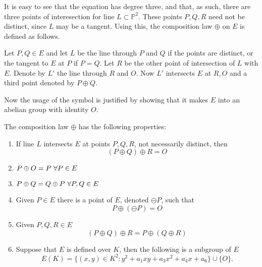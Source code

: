 It is easy to see that the equation has degree three, and that, as such, there are three points of interesection for line $L\subset\mathbb{P}^2$. These points $P,Q,R$ need not be distinct, since $L$ may be a tangent. Using this, the composition law $\oplus$ on $E$ is defined as follows.
\begin{defn}
	Let $P,Q\in E$ and let $L$ be the line through $P$ and $Q$ if the points are distinct, or the tangent to $E$ at $P$ if $P=Q$. Let $R$ be the other point of intersection of $L$ with $E$. Denote by $L'$ the line through $R$ and $O$. Now $L'$ intersects $E$ at $R,O$ and a third point denoted by $P\oplus Q$.
\end{defn}
Now the usage of the symbol is justified by showing that it makes $E$ into an abelian group with identity $O$.
\begin{thm}
	The composition law $\oplus$ has the following properties:
	\begin{enumerate}
		\item If line $L$ intersects $E$ at points $P,Q,R$, not necessarily distinct, then
		\begin{equation*}
		(P\oplus Q)\oplus R=O
		\end{equation*}
		\item $P\oplus O=P\text{\space}\forall P\in E$
		\item $P\oplus Q=Q\oplus P\text{\space}\forall P,Q\in E$
		\item Given $P\in E$ there is a point of $E$, denoted $\ominus P$, such that
		\begin{equation*}
		P\oplus(\ominus P)=O
		\end{equation*}
		\item Given $P,Q,R\in E$
		\begin{equation*}
		(P\oplus Q)\oplus R=P\oplus(Q\oplus R)
		\end{equation*}
		\item Suppose that $E$ is defined over $K$, then the following is a subgroup of $E$
		\begin{equation*}
		E(K)=\{(x,y)\in K^2:y^2+a_1xy+a_3x^2+a_4x+a_6\}\cup\{O\}.
		\end{equation*}
	\end{enumerate}
\end{thm}
